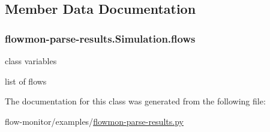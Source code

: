 \subsection{Member Data Documentation}
\subsubsection[{\texorpdfstring{flows}{flows}}]{\setlength{\rightskip}{0pt plus 5cm}flowmon-\/parse-\/results.\+Simulation.\+flows}\hypertarget{classflowmon-parse-results_1_1Simulation_a284732729c5e18035724c5565ebd75b7}{}\label{classflowmon-parse-results_1_1Simulation_a284732729c5e18035724c5565ebd75b7}


class variables

list of flows 



The documentation for this class was generated from the following file\+:\begin{DoxyCompactItemize}
\item 
flow-\/monitor/examples/\hyperlink{flowmon-parse-results_8py}{flowmon-\/parse-\/results.\+py}\end{DoxyCompactItemize}
